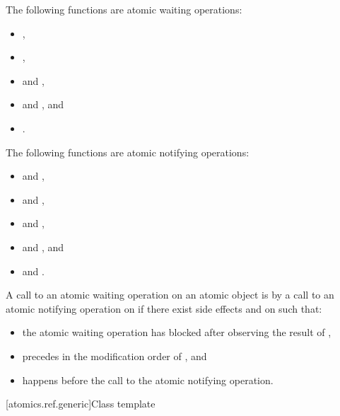 \pnum
\begin{note}
The following functions are atomic waiting operations:
\begin{itemize}
\item {},
\item {},
\item {} and ,
\item {} and , and
\item {}.
\end{itemize}
\end{note}

\pnum
\begin{note}
The following functions are atomic notifying operations:
\begin{itemize}
\item {} and ,
\item {} and ,
\item {} and ,
\item {} and , and
\item {} and .
\end{itemize}
\end{note}

%
\pnum
A call to an atomic waiting operation on an atomic object 
is 
by a call to an atomic notifying operation on 
if there exist side effects  and  on  such that:
\begin{itemize}
\item the atomic waiting operation has blocked after observing the result of ,
\item {} precedes  in the modification order of , and
\item {} happens before the call to the atomic notifying operation.
\end{itemize}

[atomics.ref.generic]{Class template }

